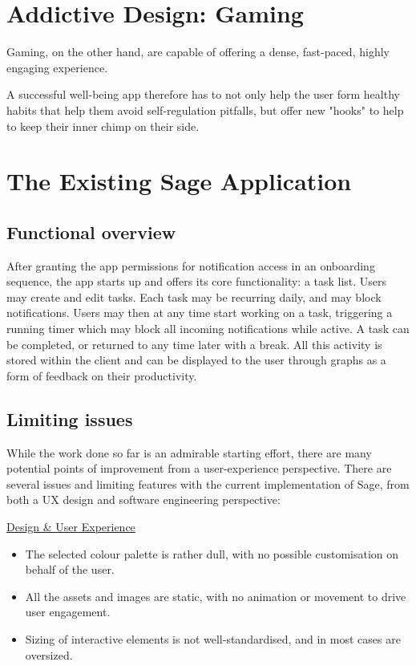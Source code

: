 \section{Addictive Design: Gaming}
Gaming, on the other hand, are capable of offering a dense, fast-paced, highly engaging experience.

A successful well-being app therefore has to not only help the user form healthy habits that help them avoid self-regulation pitfalls, but offer new "hooks" to help to keep their inner chimp on their side.

\section{The Existing Sage Application}
\subsection{Functional overview}
After granting the app permissions for notification access in an onboarding sequence, the app starts up and offers its core functionality: a task list. Users may create and edit tasks. Each task may be recurring daily, and may block notifications. Users may then at any time start working on a task, triggering a running timer which may block all incoming notifications while active. A task can be completed, or returned to any time later with a break. All this activity is stored within the client and can be displayed to the user through graphs as a form of feedback on their productivity.


\subsection{Limiting issues}
While the work done so far is an admirable starting effort, there are many potential points of improvement from a user-experience perspective. There are several issues and limiting features with the current implementation of Sage, from both a UX design and software engineering perspective:

\underline{Design \& User Experience}
\begin{itemize}
    \item The selected colour palette is rather dull, with no possible customisation on behalf of the user.
    \item All the assets and images are static, with no animation or movement to drive user engagement.
    \item Sizing of interactive elements is not well-standardised, and in most cases are oversized.
\end{itemize}

